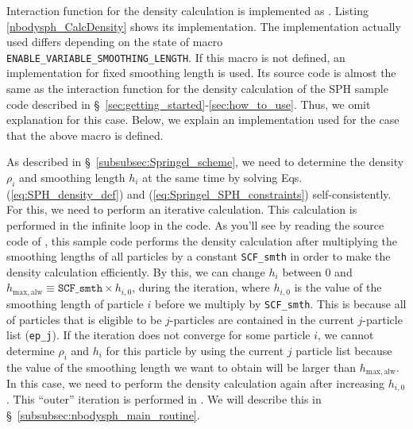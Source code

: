 \label{s3sec:NbodySPH_density_calculation}
Interaction function for the density calculation is implemented as . Listing \ref{nbodysph_CalcDensity} shows its implementation. The implementation actually used differs depending on the state of macro \texttt{ENABLE\_VARIABLE\_SMOOTHING\_LENGTH}. If this macro is not defined, an implementation for fixed smoothing length is used. Its source code is almost the same as the interaction function for the density calculation of the SPH sample code described in \S~\ref{sec:getting_started}-\ref{sec:how_to_use}. Thus, we omit explanation for this case. Below, we explain an implementation used for the case that the above macro is defined.

As described in \S~\ref{subsubsec:Springel_scheme}, we need to determine the density $\rho_{i}$ and smoothing length $h_{i}$ at the same time by solving Eqs.(\ref{eq:SPH_density_def}) and (\ref{eq:Springel_SPH_constraints}) self-consistently. For this, we need to perform an iterative calculation. This calculation is performed in the infinite  loop in the code. As you'll see by reading  the source code of , this sample code performs the density calculation after multiplying the smoothing lengths of all particles by a constant \texttt{SCF\_smth} in order to make the density calculation efficiently. By this, we can change $h_{i}$ between $0$ and $h_{\mathrm{max,alw}}\equiv \mathtt{SCF\_smth}\times h_{i,0}$, during the iteration, where $h_{i,0}$ is the value of the smoothing length of particle $i$ before we multiply by \texttt{SCF\_smth}. This is because all of particles that is eligible to be $j$-particles are contained in the current $j$-particle list (\texttt{ep\_j}). If the iteration does not converge for some particle $i$, we cannot determine $\rho_{i}$ and $h_{i}$ for this particle by using the current $j$ particle list because the value of the smoothing length we want to obtain will be larger than $h_{\mathrm{max,alw}}$. In this case, we need to perform the density calculation again after increasing $h_{i,0}$. This ``outer'' iteration is performed in . We will describe this \procedure in \S~\ref{subsubsec:nbodysph_main_routine}.

